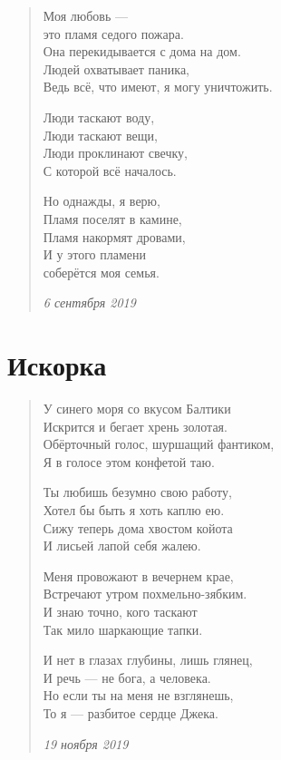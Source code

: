 \begin{verse}
Моя любовь ---\\
это пламя седого пожара.\\
Она перекидывается с дома на дом.\\
Людей охватывает паника,\\
Ведь всё, что имеют, я могу уничтожить.

Люди таскают воду,\\
Люди таскают вещи,\\
Люди проклинают свечку,\\
С которой всё началось.

Но однажды, я верю,\\
Пламя поселят в камине,\\
Пламя накормят дровами,\\
И у этого пламени\\
соберётся моя семья.

\emph{6 сентября 2019}
\end{verse}
\newpage

\section{Искорка}

\begin{verse}
У синего моря со вкусом Балтики\\
Искрится и бегает хрень золотая.\\
Обёрточный голос, шуршащий фантиком,\\
Я в голосе этом конфетой таю.

Ты любишь безумно свою работу,\\
Хотел бы быть я хоть каплю ею.\\
Сижу теперь дома хвостом койота\\
И лисьей лапой себя жалею.

Меня провожают в вечернем крае,\\
Встречают утром похмельно-зябким.\\
И знаю точно, кого таскают\\
Так мило шаркающие тапки.

И нет в глазах глубины, лишь глянец,\\
И речь --- не бога, а человека.\\
Но если ты на меня не взглянешь,\\
То я --- разбитое сердце Джека.

\emph{19 ноября 2019}
\end{verse}
\newpage

